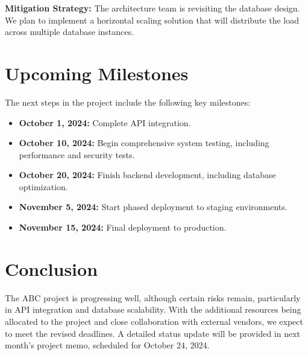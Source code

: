 \documentclass[12pt]{article}
\begin{document}
\textbf{Mitigation Strategy:} The architecture team is revisiting the database design. We plan to implement a horizontal scaling solution that will distribute the load across multiple database instances.

\section{Upcoming Milestones}
The next steps in the project include the following key milestones:

\begin{itemize}
    \item \textbf{October 1, 2024:} Complete API integration.
    \item \textbf{October 10, 2024:} Begin comprehensive system testing, including performance and security tests.
    \item \textbf{October 20, 2024:} Finish backend development, including database optimization.
    \item \textbf{November 5, 2024:} Start phased deployment to staging environments.
    \item \textbf{November 15, 2024:} Final deployment to production.
\end{itemize}

\section{Conclusion}
The ABC project is progressing well, although certain risks remain, particularly in API integration and database scalability. With the additional resources being allocated to the project and close collaboration with external vendors, we expect to meet the revised deadlines. A detailed status update will be provided in next month’s project memo, scheduled for October 24, 2024.
\end{document}
